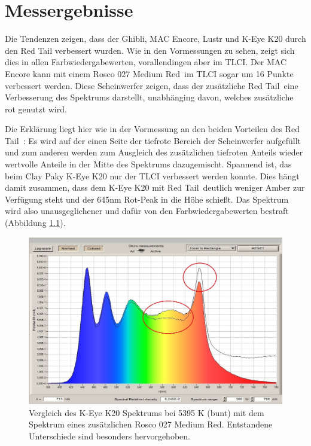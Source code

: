 
\chapter{Messergebnisse}

Die Tendenzen zeigen, dass der Ghibli, MAC Encore, Lustr und K-Eye K20 durch den Red Tail verbessert wurden. Wie in den Vormessungen zu sehen, zeigt sich dies in allen Farbwiedergabewerten, vorallendingen aber im TLCI. Der MAC Encore kann mit einem Rosco 027 \glqq Medium Red\grqq\ im TLCI sogar um 16 Punkte verbessert werden. Diese Scheinwerfer zeigen, dass der zusätzliche \glqq Red Tail\grqq\ eine Verbesserung des Spektrums darstellt, unabhänging davon, welches zusätzliche rot genutzt wird. 

Die Erklärung liegt hier wie in der Vormessung an den beiden Vorteilen des \glqq Red Tail\grqq\ : Es wird auf der einen Seite der tiefrote Bereich der Scheinwerfer aufgefüllt und zum anderen werden zum Ausgleich des zusätzlichen tiefroten Anteils wieder wertvolle Anteile in der Mitte des Spektrums dazugemischt. Spannend ist, das beim Clay Paky K-Eye K20 nur der TLCI verbessert werden konnte. Dies hängt damit zusammen, dass dem K-Eye K20 mit \glqq Red Tail\grqq\ deutlich weniger Amber zur Verfügung steht und der 645nm Rot-Peak in die Höhe schießt. Das Spektrum wird also unausgeglichener und dafür von den Farbwiedergabewerten bestraft (Abbildung \ref{b_keye1}).
\begin{figure}[H]     %
\centering
\includegraphics[width=1.0\textwidth]{bilder/keye1} 
\caption {Vergleich des K-Eye K20 Spektrums bei 5395 K (bunt) mit dem Spektrum eines zusätzlichen Rosco 027 \glqq Medium Red\grqq . Entstandene Unterschiede sind besonders hervorgehoben.}\label{b_keye1}
\end{figure}

